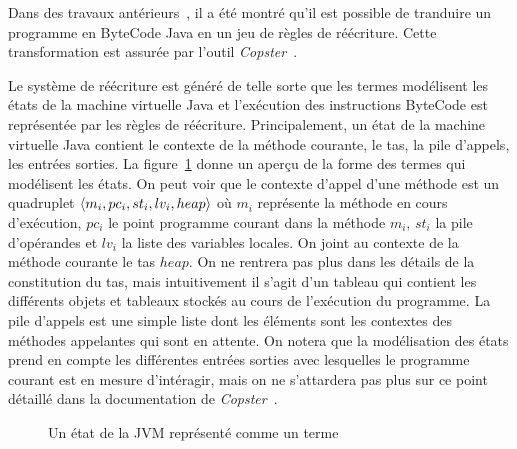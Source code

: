 Dans des travaux antérieurs~\cite{BoichutGJL-RTA07}, 
il a été montré qu'il est possible de tranduire un programme 
en ByteCode Java en un jeu de règles de réécriture. Cette transformation
est assurée par l'outil \emph{Copster}~\cite{Copster}.

Le système de réécriture est généré de telle sorte que les termes
modélisent les états de la machine virtuelle Java et l'exécution des
instructions ByteCode est représentée par les règles de
réécriture. Principalement, un état de la machine virtuelle Java
contient le contexte de la méthode courante, le tas, la pile d'appels,
les entrées sorties.  La figure~\ref{fig:etat-terme} donne un aperçu
de la forme des termes qui modélisent les états. On peut voir que le
contexte d'appel d'une méthode est un quadruplet $\langle m_i, pc_i, st_i,
lv_i, heap\rangle$ où $m_i$ représente la méthode en cours d'exécution,
$pc_i$ le point programme courant dans la méthode $m_i$, $st_i$ la
pile d'opérandes et $lv_i$ la liste des variables locales. On joint au
contexte de la méthode courante le tas $heap$. On ne rentrera pas plus
dans les détails de la constitution du tas, mais intuitivement il
s'agit d'un tableau qui contient les différents objets et tableaux
stockés au cours de l'exécution du programme. 
La pile d'appels est une simple liste dont les éléments sont les contextes des méthodes appelantes qui sont en attente.
On notera que la modélisation des états prend en compte les différentes entrées sorties avec lesquelles le programme courant
est en mesure d'intéragir, mais on ne s'attardera pas plus sur ce point détaillé dans la documentation de \emph{Copster}~\cite{Copster}.
\begin{figure}[ht!]
  \centering
  {\tiny
  }
  \caption{\footnotesize Un état de la JVM représenté comme un terme}
  \label{fig:etat-terme}
\end{figure}

